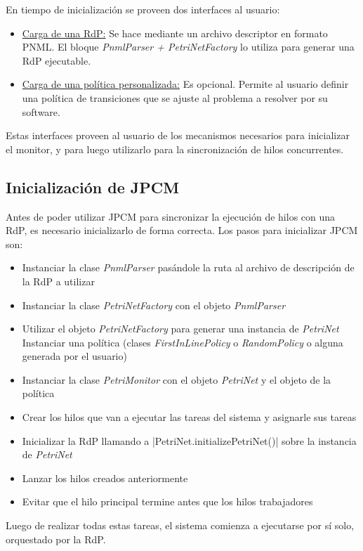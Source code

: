 En tiempo de inicialización se proveen dos interfaces al usuario:
\begin{itemize} 
  \item \underline{Carga de una RdP:} Se hace mediante un archivo descriptor
  en formato PNML. El bloque \textit{PnmlParser + PetriNetFactory} lo utiliza
  para generar una RdP ejecutable.
  \item \underline{Carga de una política personalizada:} Es opcional. Permite
  al usuario definir una política de transiciones que se ajuste al problema a
  resolver por su software.
\end{itemize}

Estas interfaces proveen al usuario de los mecanismos necesarios para
inicializar el monitor, y para luego utilizarlo para la sincronización de hilos
concurrentes.

\subsection{Inicialización de JPCM}
Antes de poder utilizar JPCM para sincronizar la ejecución de hilos con una
RdP, es necesario inicializarlo de forma correcta. Los pasos para inicializar
JPCM son:
\begin{itemize}
  \item Instanciar la clase \textit{PnmlParser} pasándole la ruta al archivo de
  descripción de la RdP a utilizar
  \item Instanciar la clase \textit{PetriNetFactory} con el objeto
  \textit{PnmlParser}
  \item Utilizar el objeto \textit{PetriNetFactory} para generar una instancia
  de \textit{PetriNet}
  \tem Instanciar una política (clases \textit{FirstInLinePolicy} o
  \textit{RandomPolicy} o alguna generada por el usuario)
  \item Instanciar la clase \textit{PetriMonitor} con el objeto
  \textit{PetriNet} y el objeto de la política
  \item Crear los hilos que van a ejecutar las tareas del sistema y asignarle
  sus tareas
  \item Inicializar la RdP llamando a |PetriNet.initializePetriNet()|
  sobre la instancia de \textit{PetriNet}
  \item Lanzar los hilos creados anteriormente
  \item Evitar que el hilo principal termine antes que los hilos trabajadores
\end{itemize}
 
Luego de realizar todas estas tareas, el sistema comienza a ejecutarse por sí
solo, orquestado por la RdP.

